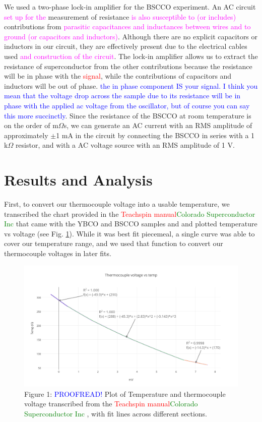 \documentclass[prb,preprint]{revtex4-1}
\begin{document}
We used a two-phase lock-in amplifier for the BSCCO experiment. An AC circuit \textcolor{magenta}{set up for the} measurement of resistance \textcolor{magenta}{is also susceptible to (or includes) } contributions from \textcolor{magenta}{parasitic capacitances and inductances between wires and to ground (or capacitors and inductors)}. 
Although there are no explicit capacitors or inductors in our circuit, they are effectively present due to the electrical cables used \textcolor{magenta}{and construction of the circuit}. 
The lock-in amplifier allows us to extract the resistance of superconductor from the other contributions because the resistance will be in phase with the \textcolor{red}{signal}, while the contributions of capacitors and inductors will be out of phase. \textcolor{blue}{the in phase component IS your signal. I think you mean that the voltage drop across the sample due to its resistance will be in phase with the applied ac voltage from the oscillator, but of course you can say this more succinctly}. 
Since the resistance of the BSCCO at room temperature is on the order of m$\Omega$s, we can generate an AC current with an RMS amplitude of approximately $\pm$1 mA in the circuit by connecting the BSCCO in series with a 1 k$\Omega$ resistor, and with a AC voltage source with an RMS amplitude of 1 V. 



\section{Results and Analysis}

First, to convert our thermocouple voltage into a usable temperature, we transcribed the chart provided in the \textcolor{red}{Teachspin manual}\textcolor{green}{Colorado Superconductor Inc} that came with the YBCO and BSCCO samples and and plotted temperature vs voltage (see Fig. \ref{TCplot}). While it was best fit piecemeal, a single curve was able to cover our temperature range, and we used that function to convert our thermocouple voltages in later fits.

\begin{figure}[h!]
\centering
\includegraphics[width=7in]{thermocouple_voltage_vs_temp.png}
\caption{Figure 1: \textcolor{blue}{PROOFREAD!} Plot of Temperature and thermocouple voltage transcribed from the \textcolor{red}{Teachspin manual}\textcolor{green}{Colorado Superconductor Inc} , with fit lines across different sections.}
\label{TCplot}
\end{figure}
\end{document}
